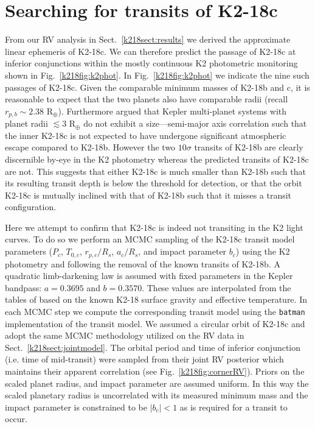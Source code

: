 \section{Searching for transits of K2-18c} \label{k218sect:transit}
From our RV analysis in Sect.~\ref{k218sect:results} we derived the approximate linear ephemeris of
K2-18c. We can therefore predict the passage of K2-18c at inferior conjunctions within the
mostly continuous K2 photometric monitoring shown in Fig.~\ref{k218fig:k2phot}. In
Fig.~\ref{k218fig:k2phot} we indicate the nine such passages of K2-18c. Given the comparable minimum masses of
K2-18b and c, it is reasonable to expect that the two planets also have comparable radii (recall
$r_{p,b} \sim 2.38$ R$_{\oplus}$). Furthermore \citep{ciardi13} argued that Kepler multi-planet
systems with planet radii $\lesssim 3$ R$_{\oplus}$ do not exhibit a size---semi-major axis
correlation such that the inner K2-18c is not expected to have undergone significant atmospheric
escape compared to K2-18b. However the two $10\sigma$ transits of K2-18b
are clearly discernible by-eye in the K2 photometry whereas the predicted transits of K2-18c
are not. This suggests that either K2-18c is much smaller than K2-18b such that its resulting
transit depth is below the threshold for detection, or that
the orbit K2-18c is mutually inclined with that of K2-18b such that it misses a transit configuration.

Here we attempt to confirm that K2-18c is indeed not transiting in the K2 light curves. To do so
we perform an MCMC sampling of the K2-18c transit
model parameters ($P_c$, $T_{0,c}$, $r_{p,c}/R_s$, $a_c/R_s$, and impact parameter $b_c$)
using the K2 photometry and
following the removal of the known transits of K2-18b. A quadratic limb-darkening law is
assumed with fixed parameters in the Kepler bandpass: $a=0.3695$ and $b=0.3570$. These values
are interpolated from the tables of
\cite{claret11} based on the known K2-18 surface gravity and effective temperature. 
In each MCMC step we compute the corresponding transit model using the \texttt{batman} implementation
\citep{kreidberg15} of the \cite{mandel02} transit model.
We assumed a circular orbit of K2-18c and adopt the same MCMC methodology
utilized on the RV data in Sect.~\ref{k218sect:jointmodel}. The orbital period and time of inferior
conjunction (i.e. time of mid-transit) were sampled from their joint RV posterior which maintains
their apparent correlation (see Fig.~\ref{k218fig:cornerRV}). Priors on
the scaled planet radius, and impact parameter are assumed uniform. In this way
the scaled planetary radius is uncorrelated with its measured minimum mass and the impact parameter is
constrained to be $|b_c|<1$ as is required for a transit to occur.

